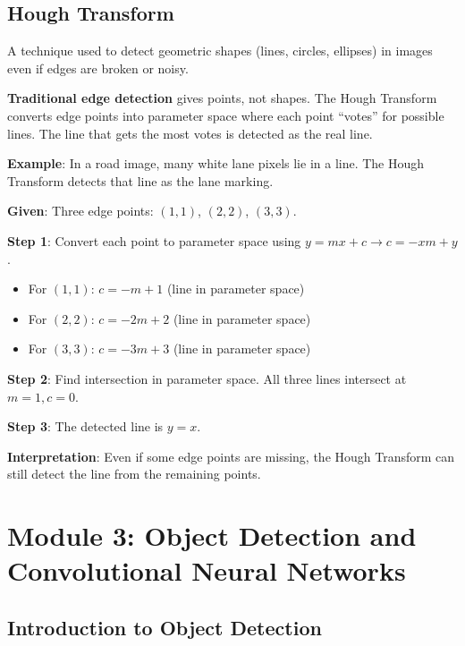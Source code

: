\documentclass[11pt,a4paper]{article}
\begin{document}
\subsection{Hough Transform}

A technique used to detect geometric shapes (lines, circles, ellipses) in images even if edges are broken or noisy.

\textbf{Traditional edge detection} gives points, not shapes. The Hough Transform converts edge points into parameter space where each point ``votes'' for possible lines. The line that gets the most votes is detected as the real line.

\textbf{Example}: In a road image, many white lane pixels lie in a line. The Hough Transform detects that line as the lane marking.

\begin{tcolorbox}[colback=yellow!5!white,colframe=yellow!75!black,title=\textbf{Worked Example 8: Hough Transform Line Detection}]
\textbf{Given}: Three edge points: $(1, 1)$, $(2, 2)$, $(3, 3)$.

\textbf{Step 1}: Convert each point to parameter space using $y = mx + c \to c = -xm + y$.
\begin{itemize}
    \item For $(1, 1)$: $c = -m + 1$ (line in parameter space)
    \item For $(2, 2)$: $c = -2m + 2$ (line in parameter space)
    \item For $(3, 3)$: $c = -3m + 3$ (line in parameter space)
\end{itemize}

\textbf{Step 2}: Find intersection in parameter space. All three lines intersect at $m = 1, c = 0$.

\textbf{Step 3}: The detected line is $y = x$.

\textbf{Interpretation}: Even if some edge points are missing, the Hough Transform can still detect the line from the remaining points.
\end{tcolorbox}

\newpage

\section{Module 3: Object Detection and Convolutional Neural Networks}

\subsection{Introduction to Object Detection}
\end{document}
